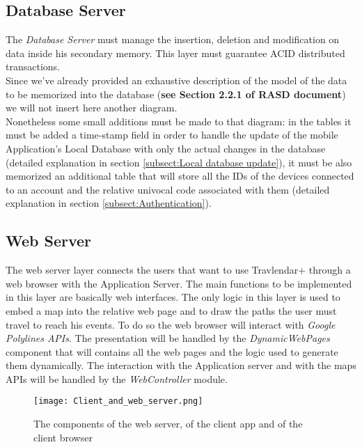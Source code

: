 \subsection{Database Server}
\label{subsect:Database}
	The \textit{Database Server} must manage the insertion, deletion and modification on data inside his secondary memory. This layer must guarantee ACID distributed transactions.\\
	Since we've already provided an exhaustive description of the model of the data to be memorized into the database (\textbf{see Section 2.2.1 of RASD document}) we will not insert here another diagram.\\
	Nonetheless some small additions must be made to that diagram: in the tables it must be added a time-stamp field in order to handle the update of the mobile Application's Local Database with only the actual changes in the database (detailed explanation in section \ref{subsect:Local database update}), it must be also memorized an additional table that will store all the IDs of the devices connected to an account and the relative univocal code associated with them (detailed explanation in section \ref{subsect:Authentication}).	

\subsection{Web Server}
\label{subsect:Web Server}
	The web server layer connects the users that want to use Travlendar+ through a web browser with the Application Server. \newline
	The main functions to be implemented in this layer are basically web interfaces.
	The only logic in this layer is used to embed a map into the relative web page and to draw the paths the user must travel to reach his events. To do so the web browser will interact with\textit{ Google Polylines APIs}.
	The presentation will be handled by the \textit{DynamicWebPages} component that will contains all the web pages and the logic used to generate them dynamically. The interaction with the Application server and with the maps APIs will be handled by the \textit{WebController} module.
	
\begin{figure}[H]
\begin{center}
		\hspace*{-0pt}
		\texttt{[image: Client\_and\_web\_server.png]}
\end{center}
\caption{The components of the web server, of the client app and of the client browser}
\end{figure}

